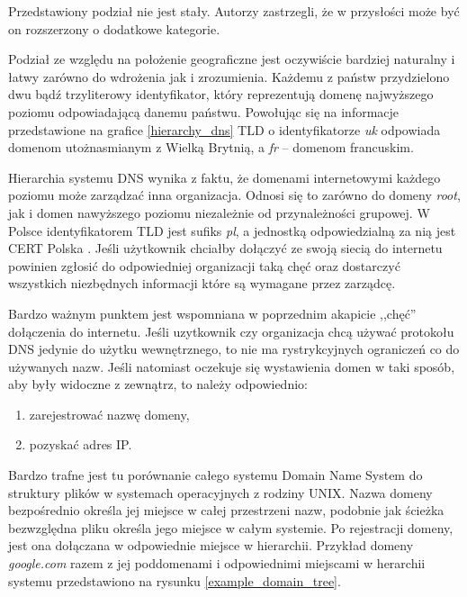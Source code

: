 Przedstawiony podział nie jest stały. Autorzy zastrzegli, że w przysłości może być on rozszerzony o dodatkowe kategorie.

Podział ze względu na położenie geograficzne jest oczywiście bardziej naturalny i łatwy zarówno do wdrożenia jak i zrozumienia. Każdemu z państw przydzielono dwu bądź trzyliterowy identyfikator, który reprezentują domenę najwyższego poziomu odpowiadającą danemu państwu. Powołując się na informacje przedstawione na grafice \ref{hierarchy_dns} TLD o identyfikatorze \textit{uk} odpowiada domenom utożnasmianym z Wielką Brytnią, a \textit{fr} -- domenom francuskim.

Hierarchia systemu DNS wynika z faktu, że domenami internetowymi każdego poziomu może zarządzać inna organizacja. Odnosi się to zarówno do domeny \textit{root}, jak i domen nawyższego poziomu niezależnie od przynależności grupowej. W Polsce identyfikatorem TLD jest sufiks \textit{pl}, a jednostką odpowiedzialną za nią jest CERT Polska \cite{cert}. Jeśli użytkownik chciałby dołączyć ze swoją siecią do internetu powinien zgłosić do odpowiedniej organizacji taką chęć oraz dostarczyć wszystkich niezbędnych informacji które są wymagane przez zarządcę. 

Bardzo ważnym punktem jest wspomniana w poprzednim akapicie ,,chęć'' dołączenia do internetu. Jeśli uzytkownik czy organizacja chcą używać protokołu DNS jedynie do użytku wewnętrznego, to nie ma rystrykcyjnych ograniczeń co do używanych nazw. Jeśli natomiast oczekuje się wystawienia domen w taki sposób, aby były widoczne z zewnątrz, to należy odpowiednio:
\begin{enumerate}
	\item zarejestrować nazwę domeny,
	\item pozyskać adres IP.
\end{enumerate}

Bardzo trafne jest tu porównanie całego systemu Domain Name System do struktury plików w systemach operacyjnych z rodziny UNIX.  Nazwa domeny bezpośrednio określa jej miejsce w całej przestrzeni nazw, podobnie jak ścieżka bezwzględna pliku określa jego miejsce w całym systemie. Po rejestracji domeny, jest ona dołączana w odpowiednie miejsce w hierarchii. Przykład domeny \textit{google.com} razem z jej poddomenami i odpowiednimi miejscami w herarchii systemu przedstawiono na rysunku \ref{example_domain_tree}.

